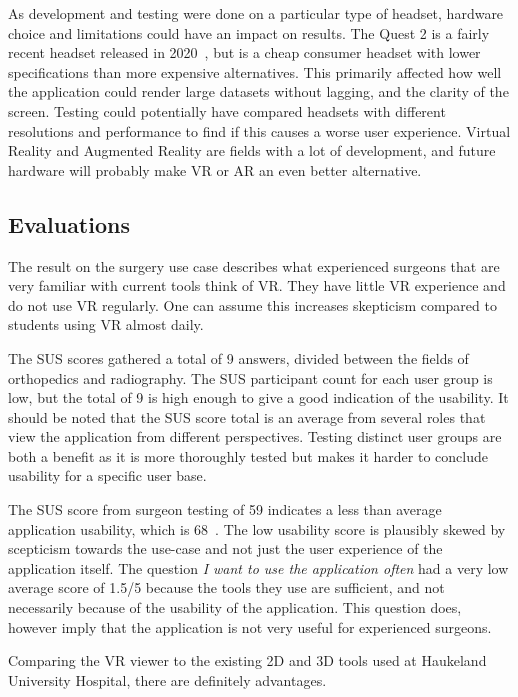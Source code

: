 \documentclass[a4paper]{report}
\begin{document}
As development and testing were done on a particular type of headset, hardware choice and limitations could have an impact on results. The Quest 2 is a fairly recent headset released in 2020~\cite{noauthor_oculus_nodate}, but is a cheap consumer headset with lower specifications than more expensive alternatives. This primarily affected how well the application could render large datasets without lagging, and the clarity of the screen.
Testing could potentially have compared headsets with different resolutions and performance to find if this causes a worse user experience.
Virtual Reality and Augmented Reality are fields with a lot of development, and future hardware will probably make VR or AR an even better alternative.

\subsection{Evaluations} %
The result on the surgery use case describes what experienced surgeons that are very familiar with current tools think of VR. They have little VR experience and do not use VR regularly. One can assume this increases skepticism compared to students using VR almost daily.

The SUS scores gathered a total of 9 answers, divided between the fields of orthopedics and radiography.
The SUS participant count for each user group is low, but the total of 9 is high enough to give a good indication of the usability. It should be noted that the SUS score total is an average from several roles that view the application from different perspectives. Testing distinct user groups are both a benefit as it is more thoroughly tested but makes it harder to conclude usability for a specific user base.

The SUS score from surgeon testing of 59 indicates a less than average application usability, which is 68~\cite{system_usability_scale_sus_system_2013}. The low usability score is plausibly skewed by scepticism towards the use-case and not just the user experience of the application itself. The question \emph{I want to use the application often} had a very low average score of 1.5/5 because the tools they use are sufficient, and not necessarily because of the usability of the application. This question does, however imply that the application is not very useful for experienced surgeons.

Comparing the VR viewer to the existing 2D and 3D tools used at Haukeland University Hospital, there are definitely advantages.
\end{document}
